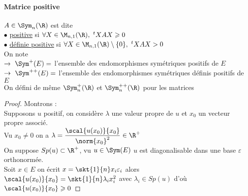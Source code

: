 		\paragraph{Matrice positive}
			$A\in\Sym_n(\R)$ est dite \\
			\hspace*{2cm} $\bullet$ \uline{positive} si $\forall X\in\M_{n,1}(\R) ,~^tXAX \geqslant 0$\\
			\hspace*{2cm} $\bullet$ \uline{définie positive} si $\forall X\in\M_{n,1}(\R)\setminus\{0\} ,~^tXAX >0$ \trait
		\\ On note\\
		$\rightarrow ~\Sym^+(E)=$ l'ensemble des endomorphismes symétriques positifs de $E$\\
		$\rightarrow ~\Sym^{++}(E)=$ l'ensemble des endomorphismes symétriques définis positifs de $E$\\
		On défini de même $\Sym_n^+(\R)$ et $\Sym_n^{++}(\R)$ pour les matrices 
		\vspace*{0.5cm} \\ 
		\begin{proof}
		Montrons \un : \\ \fbox{$\Rightarrow$} Supposons $u$ positif, on considère $\lambda$ une valeur propre de $u$ et $x_0$ un vecteur propre associé. \\
		Vu $x_0\neq 0$ on a $\lambda=\dfrac{\scal{u(x_0)}{x_0}}{\norm{x_0}^2} \in \R^+$\\
		\fbox{$\Leftarrow$} On suppose $Sp(u)\subset\R^+$, vu $u\in\Sym(E)$ $u$ est diagonalisable dans une base $\varepsilon$ orthonormée.\\ Soit $x\in E$ on écrit
		 $x=\skt{1}{n} x_i\varepsilon_i$ alors $\scal{u(x_0)}{x_0} = \skt{1}{n}\lambda_i x_i^2$ avec $\lambda_i\in Sp(u)$ d'où $\scal{u(x_0)}{x_0}\geqslant 0$
		\end{proof}
		${}$ \\ 
